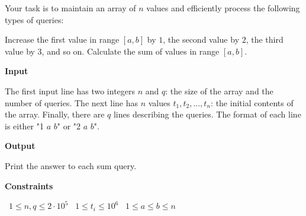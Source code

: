 Your task is to maintain an array of $n$ values and efficiently process the following types of queries:

Increase the first value in range $[a,b]$ by $1$, the second value by $2$, the third value by $3$, and so on.
Calculate the sum of values in range $[a,b]$.

\vspace{0.3cm}\noindent\textbf{Input}

The first input line has two integers $n$ and $q$: the size of the array and the number of queries.
The next line has $n$ values $t_1,t_2,\dots,t_n$: the initial contents of the array.
Finally, there are $q$ lines describing the queries. The format of each line is either "1 $a$ $b$" or "2 $a$ $b$".

\vspace{0.3cm}\noindent\textbf{Output}

Print the answer to each sum query.

\vspace{0.3cm}\noindent\textbf{Constraints}

\textbullet\ $1 \le n, q \le 2 \cdot 10^5$
\textbullet\ $1 \le t_i \le 10^6$
\textbullet\ $1 \le a \le b \le n$